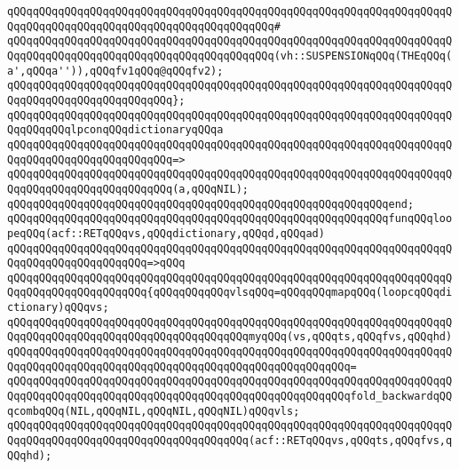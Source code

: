 \verb|qQQqqQQqqQQqqQQqqQQqqQQqqQQqqQQqqQQqqQQqqQQqqQQqqQQqqQQqqQQqqQQqqQQqqQQqqQQqqQQqqQQqqQQqqQQqqQQqqQQqqQQqqQQqqQQq#|\newline
\verb|qQQqqQQqqQQqqQQqqQQqqQQqqQQqqQQqqQQqqQQqqQQqqQQqqQQqqQQqqQQqqQQqqQQqqQQqqQQqqQQqqQQqqQQqqQQqqQQqqQQqqQQqqQQqqQQq(vh::SUSPENSIONqQQq(THEqQQq(a',qQQqa'')),qQQqfv1qQQq@qQQqfv2);|\newline
\verb|qQQqqQQqqQQqqQQqqQQqqQQqqQQqqQQqqQQqqQQqqQQqqQQqqQQqqQQqqQQqqQQqqQQqqQQqqQQqqQQqqQQqqQQqqQQqqQQq};|\newline
\newline
\verb|qQQqqQQqqQQqqQQqqQQqqQQqqQQqqQQqqQQqqQQqqQQqqQQqqQQqqQQqqQQqqQQqqQQqqQQqqQQqqQQqlpconqQQqdictionaryqQQqa|\newline
\verb|qQQqqQQqqQQqqQQqqQQqqQQqqQQqqQQqqQQqqQQqqQQqqQQqqQQqqQQqqQQqqQQqqQQqqQQqqQQqqQQqqQQqqQQqqQQqqQQq=>|\newline
\verb|qQQqqQQqqQQqqQQqqQQqqQQqqQQqqQQqqQQqqQQqqQQqqQQqqQQqqQQqqQQqqQQqqQQqqQQqqQQqqQQqqQQqqQQqqQQqqQQq(a,qQQqNIL);|\newline
\verb|qQQqqQQqqQQqqQQqqQQqqQQqqQQqqQQqqQQqqQQqqQQqqQQqqQQqqQQqqQQqend;|\newline
\newline
\verb|qQQqqQQqqQQqqQQqqQQqqQQqqQQqqQQqqQQqqQQqqQQqqQQqqQQqqQQqqQQqfunqQQqloopeqQQq(acf::RETqQQqvs,qQQqdictionary,qQQqd,qQQqad)|\newline
\verb|qQQqqQQqqQQqqQQqqQQqqQQqqQQqqQQqqQQqqQQqqQQqqQQqqQQqqQQqqQQqqQQqqQQqqQQqqQQqqQQqqQQqqQQqqQQq=>qQQq|\newline
\verb|qQQqqQQqqQQqqQQqqQQqqQQqqQQqqQQqqQQqqQQqqQQqqQQqqQQqqQQqqQQqqQQqqQQqqQQqqQQqqQQqqQQqqQQqqQQq{qQQqqQQqqQQqvlsqQQq=qQQqqQQqmapqQQq(loopcqQQqdictionary)qQQqvs;|\newline
\newline
\verb|qQQqqQQqqQQqqQQqqQQqqQQqqQQqqQQqqQQqqQQqqQQqqQQqqQQqqQQqqQQqqQQqqQQqqQQqqQQqqQQqqQQqqQQqqQQqqQQqqQQqqQQqqQQqmyqQQq(vs,qQQqts,qQQqfvs,qQQqhd)|\newline
\verb|qQQqqQQqqQQqqQQqqQQqqQQqqQQqqQQqqQQqqQQqqQQqqQQqqQQqqQQqqQQqqQQqqQQqqQQqqQQqqQQqqQQqqQQqqQQqqQQqqQQqqQQqqQQqqQQqqQQqqQQqqQQq=|\newline
\verb|qQQqqQQqqQQqqQQqqQQqqQQqqQQqqQQqqQQqqQQqqQQqqQQqqQQqqQQqqQQqqQQqqQQqqQQqqQQqqQQqqQQqqQQqqQQqqQQqqQQqqQQqqQQqqQQqqQQqqQQqqQQqfold_backwardqQQqcombqQQq(NIL,qQQqNIL,qQQqNIL,qQQqNIL)qQQqvls;|\newline
\newline
\verb|qQQqqQQqqQQqqQQqqQQqqQQqqQQqqQQqqQQqqQQqqQQqqQQqqQQqqQQqqQQqqQQqqQQqqQQqqQQqqQQqqQQqqQQqqQQqqQQqqQQqqQQqqQQq(acf::RETqQQqvs,qQQqts,qQQqfvs,qQQqhd);|\newline
